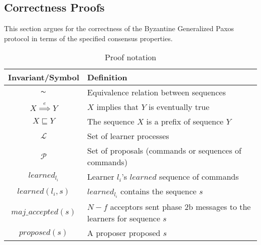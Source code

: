 \subsection{Correctness Proofs}

This section argues for the correctness of the Byzantine Generalized Paxos protocol in terms of the specified consensus properties.\par


\begin{table}[h!]
	\renewcommand{\arraystretch}{1.5}
	\centering
	\begin{tabularx}{\linewidth}{ |c|X|}
		\hline
		Invariant/Symbol & Definition \\
		\hline
		$\thicksim$ & Equivalence relation between sequences \\
		\hline
		$X \overset{e}{\implies} Y$ & $X$ implies that $Y$ is eventually true \\
		\hline
		$X \sqsubseteq Y$ & The sequence $X$ is a prefix of sequence $Y$ \\
		\hline
		$\mathcal{L}$ & Set of learner processes \\
		\hline
		$\mathcal{P}$ & Set of proposals (commands or sequences of commands) \\
		\hline
		$learned_{l_i}$ & Learner $l_i$'s $learned$ sequence of commands \\
		\hline
		$learned(l_i,s)$ & $learned_{l_i}$ contains the sequence $s$ \\
		\hline
		$maj\_accepted(s)$ & $N-f$ acceptors sent phase 2b messages to the learners for sequence $s$ \\
		\hline
		$proposed(s)$ & A proposer proposed $s$ \\
		\hline
		
  	\end{tabularx} 
	\caption{Proof notation} 
	\label{table:1}
\end{table}


